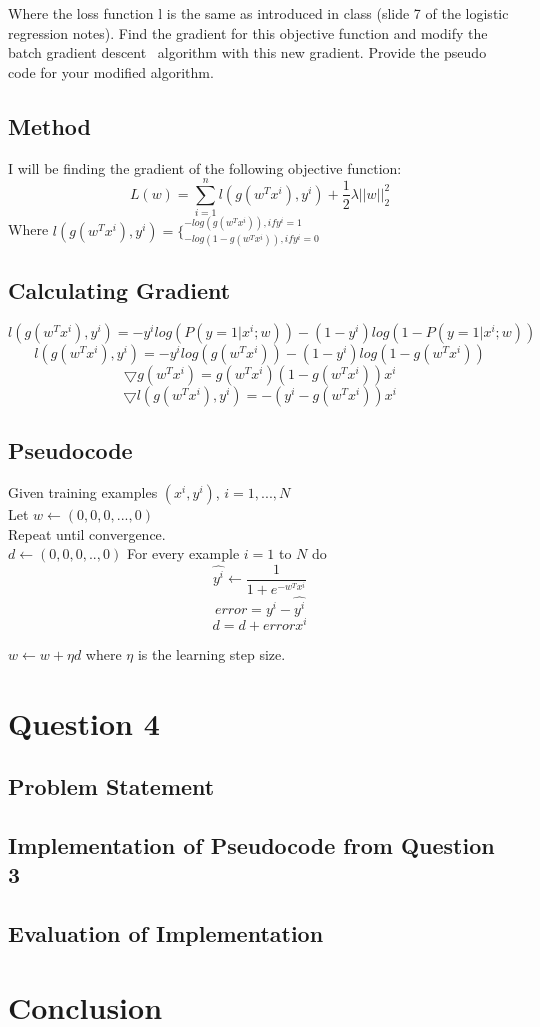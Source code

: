 \documentclass[letterpaper,10pt]{article}
\begin{document}
Where the loss function l is the same as introduced in class (slide 7 of the logistic regression 
notes). Find the gradient for this objective function and modify the batch gradient descent \
algorithm with this new gradient. Provide the pseudo code for your modified algorithm.

\subsection{Method}
I will be finding the gradient of the following objective function:
\[L(w) = \sum_{i=1}^n l(g(w^T x^i), y^i) + \frac{1}{2} \lambda ||w||_2^2  \]
Where \(l(g(w^T x^i), y^i) = \{^{-log(g(w^T x^i)), if y^i = 1}_{-log(1-g(w^T x^i)), if y^i = 0} \)

\subsection{Calculating Gradient}
\[ l(g(w^T x^i), y^i) = -y^i log(P(y=1 | x^i; w)) - (1-y^i) log(1-P(y=1 | x^i; w)) \]
\[ l(g(w^T x^i), y^i) = -y^i log(g(w^T x^i)) - (1-y^i) log(1 - g(w^T x^i)) \]
\[ \bigtriangledown g(w^T x^i) = g(w^T x^i) (1 - g(w^T x^i)) x^i \]
\[ \bigtriangledown l(g(w^T x^i), y^i) = -(y^i - g(w^T x^i)) x^i \]

\subsection{Pseudocode}
Given training examples \((x^i, y^i)\), \(i=1,...,N\)\\
Let \(w \leftarrow (0,0,0,...,0)\)\\
Repeat until convergence.\\
\(d \leftarrow (0,0,0,..,0)\)
For every example \(i=1\) to \(N\) do\\
\[ \hat{y^i} \leftarrow \frac{1}{1+e^{-w^T x^i}} \]
\[ error = y^i - \hat{y^i} \]
\[ d = d + error x^i \]

\(w \leftarrow w + \eta d \) where \(\eta\) is the learning step size.

\section{Question 4}
\subsection{Problem Statement}

\subsection{Implementation of Pseudocode from Question 3}
\subsection{Evaluation of Implementation}

\section{Conclusion}
\end{document}
